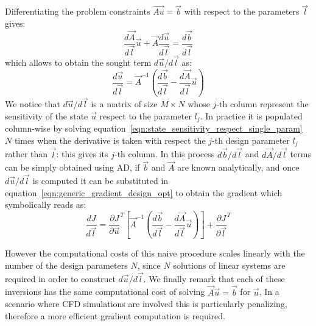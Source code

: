 \smallskip
Differentiating the problem constraints $\vec{Au} = \vec{b}$ with respect to the parameters $\vec{l}$ gives:
\begin{equation}
	\frac{d\vec{A}}{d\vec{l}} \vec{u} + \vec{A} \frac{d\vec{u}}{d\vec{l}} = \frac{d\vec{b}}{d\vec{l}}
\end{equation}
which allows to obtain the sought term $d\vec{u} / d\vec{l}$ as:
\begin{equation}
	\label{eqn:state_sensitivity_respect_single_param}
	\frac{d\vec{u}}{d\vec{l}} = \vec{A}^{-1} \left( \frac{d\vec{b}}{d\vec{l}} - \frac{d\vec{A}}{d\vec{l}}\vec{u} \right)
\end{equation}
We notice that $d\vec{u} / d\vec{l}$ is a matrix of size $M \times N$ whose $j$-th column represent the sensitivity of the state $\vec{u}$ respect to the parameter $l_j$. 
In practice it is populated column-wise by solving equation~\eqref{eqn:state_sensitivity_respect_single_param} $N$ times when the derivative is taken with respect the $j$-th design parameter $l_j$ rather than $\vec{l}$: this gives its $j$-th column. In this process $d\vec{b} / d\vec{l}$ and $d\vec{A} / d\vec{l}$ terms can be simply obtained using AD, if $\vec{b}$ and $\vec{A}$ are known analytically, and once $d\vec{u} / d\vec{l}$ is computed it can be substituted in equation~\eqref{eqn:generic_gradient_design_opt} to obtain the gradient which symbolically reads as:
\begin{equation}
	\label{eqn:generic_gradient_design_opt_naive}
	\frac{dJ}{d\vec{l}} = \frac{\partial J}{\partial \vec{u}}^T \left[ \vec{A}^{-1} \left( \frac{d\vec{b}}{d\vec{l}} - \frac{d\vec{A}}{d\vec{l}}\vec{u} \right) \right]  + \frac{\partial J}{\partial \vec{l}}^T
\end{equation}

However the computational costs of this naive procedure scales linearly with the number of the design parameters $N$, since $N$ solutions of linear systems are required in order to construct $d\vec{u} / d\vec{l}$. We finally remark that each of these inversions has the same computational cost of solving $\vec{A} \vec{u}= \vec{b}$ for $\vec{u}$. In a scenario where CFD simulations are involved this is particularly penalizing, therefore a more efficient gradient computation is required.

